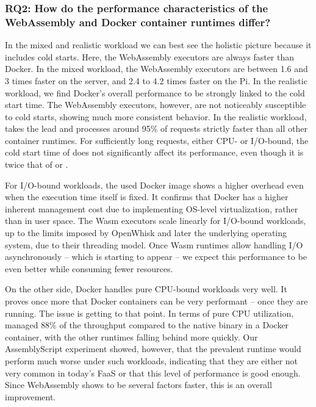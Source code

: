 \subsubsection*{RQ2: How do the performance characteristics of the WebAssembly and Docker container runtimes differ?}

In the mixed and realistic workload we can best see the holistic picture because it includes cold starts. Here, the WebAssembly executors are always faster than Docker. In the mixed workload, the WebAssembly executors are between 1.6 and 3 times faster on the server, and 2.4 to 4.2 times faster on the Pi. In the realistic workload, we find Docker's overall performance to be strongly linked to the cold start time. The WebAssembly executors, however, are not noticeably susceptible to cold starts, showing much more consistent behavior. In the realistic workload,  takes the lead and processes around 95\% of requests strictly faster than all other container runtimes. For sufficiently long requests, either CPU- or I/O-bound, the cold start time of  does not significantly affect its performance, even though it is twice that of  or .

For I/O-bound workloads, the used Docker image shows a higher overhead even when the execution time itself is fixed. It confirms that Docker has a higher inherent management cost due to implementing OS-level virtualization, rather than in user space.
The Wasm executors scale linearly for I/O-bound workloads, up to the limits imposed by OpenWhisk and later the underlying operating system, due to their threading model. Once Wasm runtimes allow handling I/O asynchronously -- which is starting to appear -- we expect this performance to be even better while consuming fewer resources.

On the other side, Docker handles pure CPU-bound workloads very well. It proves once more that Docker containers can be very performant -- once they are running. The issue is getting to that point.
In terms of pure CPU utilization,  managed 88\% of the throughput compared to the native binary in a Docker container, with the other runtimes falling behind more quickly. Our AssemblyScript experiment showed, however, that the prevalent  runtime would perform much worse under such workloads, indicating that they are either not very common in today's FaaS or that this level of performance is good enough. Since WebAssembly shows to be several factors faster, this is an overall improvement.

